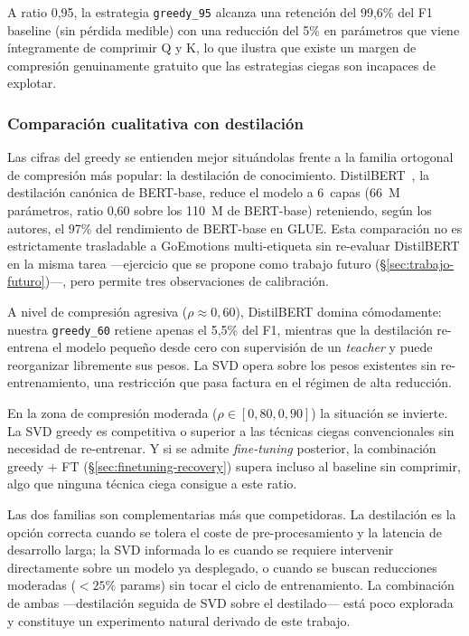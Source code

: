 A ratio 0{,}95, la estrategia \texttt{greedy\_95} alcanza una retención
del 99{,}6\% del F1 baseline (sin pérdida medible) con
una reducción del 5\% en parámetros que viene íntegramente de comprimir Q
y K, lo que ilustra que existe un margen de compresión genuinamente
gratuito que las estrategias ciegas son incapaces de explotar.

\subsubsection{Comparación cualitativa con destilación}
\label{sec:greedy-vs-distilbert}

Las cifras del greedy se entienden mejor situándolas frente a la
familia ortogonal de compresión más popular: la destilación de
conocimiento.
DistilBERT~\cite{sanh2019distilbert}, la destilación canónica de
BERT-base, reduce el modelo a 6~capas (66~M parámetros, ratio
0{,}60 sobre los 110~M de BERT-base) reteniendo, según los autores,
el 97\% del rendimiento de BERT-base en GLUE. Esta comparación no es
estrictamente trasladable a GoEmotions multi-etiqueta sin re-evaluar
DistilBERT en la misma tarea ---ejercicio que se propone como
trabajo futuro (\S\ref{sec:trabajo-futuro})---, pero permite tres
observaciones de calibración.

A nivel de compresión agresiva ($\rho \approx 0{,}60$), DistilBERT
domina cómodamente: nuestra \texttt{greedy\_60} retiene apenas el
5{,}5\% del F1, mientras que la destilación re-entrena el modelo
pequeño desde cero con supervisión de un \emph{teacher} y puede
reorganizar libremente sus pesos. La SVD opera sobre los pesos
existentes sin re-entrenamiento, una restricción que pasa factura en
el régimen de alta reducción.

En la zona de compresión moderada ($\rho \in [0{,}80, 0{,}90]$) la
situación se invierte. La SVD greedy es competitiva o superior a las
técnicas ciegas convencionales sin necesidad de re-entrenar. Y si se
admite \emph{fine-tuning} posterior, la combinación greedy + FT
(\S\ref{sec:finetuning-recovery}) supera incluso al baseline sin
comprimir, algo que ninguna técnica ciega consigue a este ratio.

Las dos familias son complementarias más que competidoras. La
destilación es la opción correcta cuando se tolera el coste de
pre-procesamiento y la latencia de desarrollo larga; la SVD informada
lo es cuando se requiere intervenir directamente sobre un modelo ya
desplegado, o cuando se buscan reducciones moderadas
($<25\%$ params) sin tocar el ciclo de entrenamiento. La combinación
de ambas ---destilación seguida de SVD sobre el destilado--- está
poco explorada y constituye un experimento natural derivado de este
trabajo.

